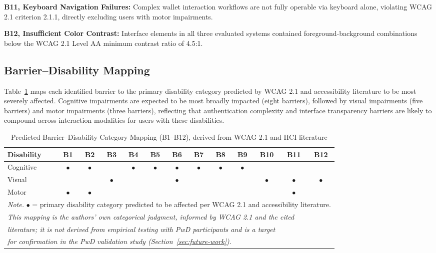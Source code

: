 \documentclass[journal,onecolumn]{IEEEtran}
\begin{document}
\textbf{B11, Keyboard Navigation Failures:} Complex wallet interaction workflows are not fully operable via keyboard alone, violating WCAG 2.1 criterion 2.1.1, directly excluding users with motor impairments.

\textbf{B12, Insufficient Color Contrast:} Interface elements in all three evaluated systems contained foreground-background combinations below the WCAG 2.1 Level AA minimum contrast ratio of 4.5:1.


\subsection{Barrier--Disability Mapping}

Table~\ref{tab:disability} maps each identified barrier to the primary disability category predicted by WCAG 2.1 and accessibility literature to be most severely affected. Cognitive impairments are expected to be most broadly impacted (eight barriers), followed by visual impairments (five barriers) and motor impairments (three barriers), reflecting that authentication complexity and interface transparency barriers are likely to compound across interaction modalities for users with these disabilities.

\begin{table}[htbp]
\centering
\small
\caption{Predicted Barrier--Disability Category Mapping (B1--B12), derived from WCAG 2.1 and HCI literature}
\label{tab:disability}
\begin{adjustbox}{max width=\columnwidth}
\begin{tabular}{|p{1.6cm}|*{12}{c|}}
\hline
\textbf{Disability} & \textbf{B1} & \textbf{B2} & \textbf{B3} & \textbf{B4} & \textbf{B5} & \textbf{B6} & \textbf{B7} & \textbf{B8} & \textbf{B9} & \textbf{B10} & \textbf{B11} & \textbf{B12} \\
\hline
Cognitive & $\bullet$ & $\bullet$ &  & $\bullet$ & $\bullet$ & $\bullet$ & $\bullet$ & $\bullet$ & $\bullet$ &  &  &  \\
\hline
Visual &  &  & $\bullet$ &  &  & $\bullet$ &  &  &  & $\bullet$ & $\bullet$ & $\bullet$ \\
\hline
Motor & $\bullet$ & $\bullet$ &  &  &  &  &  &  &  &  & $\bullet$ &  \\
\hline
\multicolumn{13}{l}{\footnotesize\textit{Note.} $\bullet$ = primary disability category predicted to be affected per WCAG 2.1 and accessibility literature.}\\
\multicolumn{13}{l}{\footnotesize\textit{This mapping is the authors' own categorical judgment, informed by WCAG 2.1 and the cited}}\\
\multicolumn{13}{l}{\footnotesize\textit{literature; it is not derived from empirical testing with PwD participants and is a target}}\\
\multicolumn{13}{l}{\footnotesize\textit{for confirmation in the PwD validation study (Section~\ref{sec:future-work}).}}\\
\end{tabular}
\end{adjustbox}
\end{table}
\end{document}
